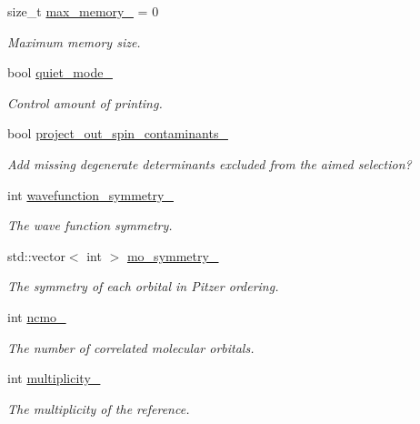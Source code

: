 \begin{DoxyCompactItemize}
size\+\_\+t \mbox{\hyperlink{classforte_1_1_selected_c_i_method_ac1692f1436e87e91a11a0cffade9d6c2}{max\+\_\+memory\+\_\+}} = 0
\begin{DoxyCompactList}\small\item\em Maximum memory size. \end{DoxyCompactList}\item 
bool \mbox{\hyperlink{classforte_1_1_selected_c_i_method_a08140c99cde6246d9ba7eab870d76648}{quiet\+\_\+mode\+\_\+}}
\begin{DoxyCompactList}\small\item\em Control amount of printing. \end{DoxyCompactList}\item 
bool \mbox{\hyperlink{classforte_1_1_selected_c_i_method_a2945040471ac44936a6d6506b2958a56}{project\+\_\+out\+\_\+spin\+\_\+contaminants\+\_\+}}
\begin{DoxyCompactList}\small\item\em Add missing degenerate determinants excluded from the aimed selection? \end{DoxyCompactList}\item 
int \mbox{\hyperlink{classforte_1_1_selected_c_i_method_adadff11455f82994ca86bbf17f1f73f3}{wavefunction\+\_\+symmetry\+\_\+}}
\begin{DoxyCompactList}\small\item\em The wave function symmetry. \end{DoxyCompactList}\item 
std\+::vector$<$ int $>$ \mbox{\hyperlink{classforte_1_1_selected_c_i_method_a4075f4677a0bbb3a3281769703ea5e84}{mo\+\_\+symmetry\+\_\+}}
\begin{DoxyCompactList}\small\item\em The symmetry of each orbital in Pitzer ordering. \end{DoxyCompactList}\item 
int \mbox{\hyperlink{classforte_1_1_selected_c_i_method_a6622390dbd8c7c963c20bc15c1df3f45}{ncmo\+\_\+}}
\begin{DoxyCompactList}\small\item\em The number of correlated molecular orbitals. \end{DoxyCompactList}\item 
int \mbox{\hyperlink{classforte_1_1_selected_c_i_method_a77e584c37a01e6dcb40484731bbebd59}{multiplicity\+\_\+}}
\begin{DoxyCompactList}\small\item\em The multiplicity of the reference. \end{DoxyCompactList}\item 

\end{DoxyCompactItemize}
